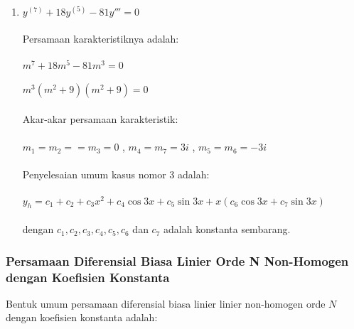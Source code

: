 \begin{enumerate}[1.]
	\item \begin{math} y^{(7)} + 18y^{(5)} - 81y''' = 0 \end{math} \\ \\
	Persamaan karakteristiknya adalah: \\ \\
	\begin{math} m^{7} + 18m^{5} - 81m^{3} = 0 \end{math} \\ \\
	\begin{math} m^{3} (m^{2} + 9)(m^{2} + 9) = 0 \end{math} \\ \\
	Akar-akar persamaan karakteristik: \\ \\
	\begin{math} m_1 = m_2 = = m_3 = 0 \end{math} , \begin{math} m_4 = m_7 = 3i \end{math} , \begin{math} m_5 = m_6= - 3i  \end{math} \\ \\
	Penyelesaian umum kasus nomor 3 adalah: \\ \\
	\begin{math} y_h = c_1 + c_2 + c_3 x^{2} + c_4 \cos 3x + c_5 \sin 3x + x (c_6 \cos 3x + c_7 \sin 3x) \end{math} \\ \\
	dengan \begin{math} c_1, c_2, c_3, c_4, c_5, c_6 \end{math} dan \begin{math} c_7 \end{math} adalah konstanta sembarang.

\end{enumerate}

\subsubsection{Persamaan Diferensial Biasa Linier Orde N Non-Homogen dengan Koefisien Konstanta}
\label{parff:PDBLONNHKK}

Bentuk umum persamaan diferensial biasa linier linier non-homogen orde \begin{math} N \end{math} dengan koefisien konstanta adalah:

